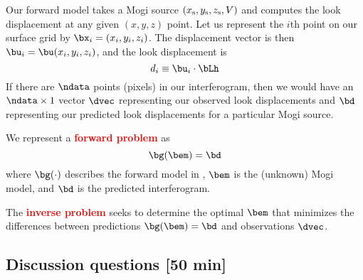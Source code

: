 \documentclass[11pt,titlepage,fleqn]{article}
\begin{document}
Our forward model takes a Mogi source $(x_{\rm s},y_{\rm s},z_{\rm s},V)$ and computes the look displacement at any given $(x,y,z)$ point. Let us represent the $i$th point on our surface grid by $\bx_i = (x_i,y_i,z_i)$. The displacement vector is then $\bu_i = \bu(x_i,y_i,z_i)$, and the look displacement is
%
\begin{equation}
d_i \equiv \bu_i \cdot \bLh
\label{forwardLOS}
\end{equation}
%
If there are $\ndata$ points (pixels) in our interferogram, then we would have an $\ndata \times 1$ vector $\dvec$ representing our observed look displacements and
$\bd$ representing our predicted look displacements for a particular Mogi source.

We represent a \textcolor{red}{\bf forward problem} as
%
\begin{equation}
\bg(\bem) = \bd
\end{equation}
%
where $\bg(\cdot)$ describes the forward model in , $\bem$ is the (unknown) Mogi model, and $\bd$ is the predicted interferogram.

The \textcolor{red}{\bf inverse problem} seeks to determine the optimal $\bem$ that minimizes the differences between predictions $\bg(\bem) = \bd$ and observations $\dvec$.


\pagebreak
\subsection*{Discussion questions [50 min]}
\end{document}
